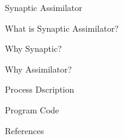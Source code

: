 Synaptic Assimilator

What is Synaptic Assimilator?

Why Synaptic?

Why Assimilator?

Process Dscription

Program Code

References
